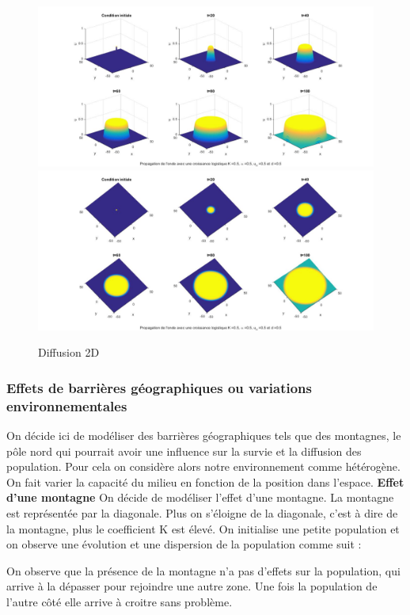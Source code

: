 \documentclass[a4paper,11pt]{article}
\begin{document}
\begin{figure}[H]
	\centering
	\includegraphics[width=1\linewidth]{SimulationKPP/KPP13}\hfill
    \includegraphics[width=1\linewidth]{SimulationKPP/KPP15}
    \caption{Diffusion 2D}
\end{figure}


\subsubsection{Effets de barrières géographiques ou variations environnementales}
On décide ici de modéliser des barrières géographiques tels que des montagnes, le pôle nord qui pourrait avoir une influence sur la survie et la diffusion des population.
Pour cela on considère alors notre environnement comme hétérogène. On fait varier la capacité du milieu en fonction de la position dans l'espace.
\textbf{Effet d'une montagne}
On décide de modéliser l'effet d'une montagne. La montagne est représentée par la diagonale. Plus on s'éloigne de la diagonale, c'est à dire de la montagne, plus le coefficient K est élevé. On initialise une petite population et on observe une évolution et une dispersion de la population comme suit : 

On observe que la présence de la montagne n'a pas d'effets sur la population, qui arrive à la dépasser pour rejoindre une autre zone. Une fois la population de l'autre côté elle arrive à croitre sans problème.
\end{document}
